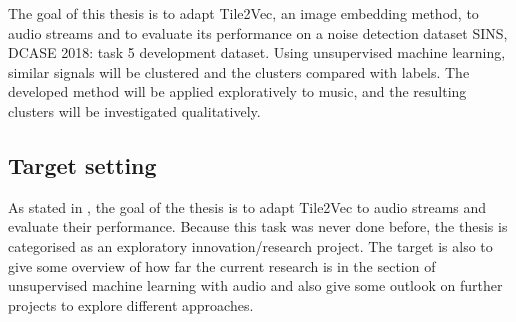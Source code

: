 The goal of this thesis is to adapt Tile2Vec, an image embedding method, to audio streams and to evaluate its performance on a noise detection dataset \flqq SINS, DCASE 2018: task 5 development dataset\frqq. Using unsupervised machine learning, similar signals will be clustered and the clusters compared with labels. The developed method will be applied exploratively to music, and the resulting clusters will be investigated qualitatively.

\subsection{Target setting}
\label{sub:Target-Setting}

As stated in , the goal of the thesis is to adapt Tile2Vec to audio streams and evaluate their performance. Because this task was never done before, the thesis is categorised as an exploratory innovation/research project. The target is also to give some overview of how far the current research is in the section of unsupervised machine learning with audio and also give some outlook on further projects to explore different approaches.